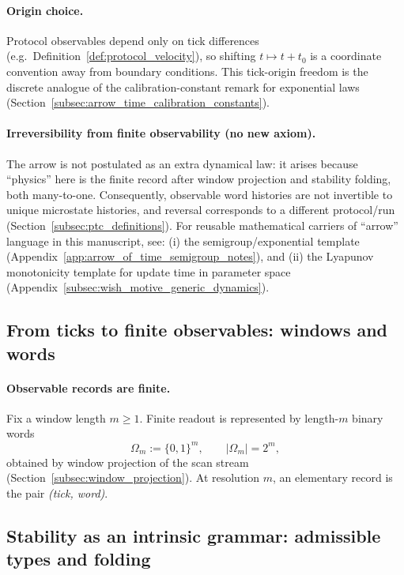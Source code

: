 \paragraph{Origin choice.}
\InterfaceTag Protocol observables depend only on tick differences (e.g.\ Definition~\ref{def:protocol_velocity}), so shifting $t\mapsto t+t_0$ is a coordinate convention away from boundary conditions.
\AuditTag This tick-origin freedom is the discrete analogue of the calibration-constant remark for exponential laws (Section~\ref{subsec:arrow_time_calibration_constants}).

\paragraph{Irreversibility from finite observability (no new axiom).}
\InterfaceTag The arrow is not postulated as an extra dynamical law: it arises because ``physics'' here is the finite record after window projection and stability folding, both many-to-one.
Consequently, observable word histories are not invertible to unique microstate histories, and reversal corresponds to a different protocol/run (Section~\ref{subsec:ptc_definitions}).
\AuditTag For reusable mathematical carriers of ``arrow'' language in this manuscript, see:
(i) the semigroup/exponential template (Appendix~\ref{app:arrow_of_time_semigroup_notes}), and
(ii) the Lyapunov monotonicity template for update time in parameter space (Appendix~\ref{subsec:wish_motive_generic_dynamics}).

\subsection{From ticks to finite observables: windows and words}
\label{subsec:tick_to_words}

\paragraph{Observable records are finite.}
Fix a window length $m\ge 1$.
Finite readout is represented by length-$m$ binary words
\[
\Omega_m:=\{0,1\}^m,
\qquad |\Omega_m|=2^m,
\]
obtained by window projection of the scan stream (Section~\ref{subsec:window_projection}).
\MathTag At resolution $m$, an elementary record is the pair \emph{(tick, word)}.

\subsection{Stability as an intrinsic grammar: admissible types and folding}
\label{subsec:tick_to_stability}

